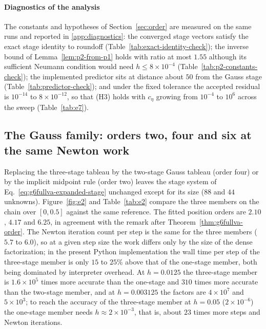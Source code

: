 \paragraph{Diagnostics of the analysis}
The constants and hypotheses of Section~\ref{sec:order} are measured on the same runs and
reported in \ref{app:diagnostics}: the converged stage vectors satisfy the exact stage identity to
roundoff (Table~\ref{tab:exact-identity-check}); the inverse bound of Lemma~\ref{lem:p2-from-p1}
holds with ratio at most $1.55$ although its sufficient Neumann condition would need
$h\le8\times10^{-4}$ (Table~\ref{tab:p2-constants-check}); the implemented predictor sits at
distance about $50$ from the Gauss stage (Table~\ref{tab:predictor-check}); and under the fixed
tolerance the accepted residual is $10^{-14}$ to $8\times10^{-12}$, so that (H3) holds with
$c_\eta$ growing from $10^{-4}$ to $10^{6}$ across the sweep (Table~\ref{tab:e7}).

\subsection{The Gauss family: orders two, four and six at the same Newton work}
\label{sec:e2}

Replacing the three-stage tableau by the two-stage Gauss tableau (order four) or by the implicit
midpoint rule (order two) leaves the stage system of Eq.~\eqref{eq:g6fullva-expanded-stage}
unchanged except for its size ($88$ and $44$ unknowns). Figure~\ref{fig:e2} and
Table~\ref{tab:e2} compare the three members on the chain over $[0,0.5]$ against the same
reference. The fitted position orders are $2.10$, $4.17$ and $6.25$, in agreement with the remark
after Theorem~\ref{thm:g6fullva-order}. The Newton iteration count per step is the same for the
three members ($5.7$ to $6.0$), so at a given step size the work differs only by the size of the
dense factorization; in the present Python implementation the wall time per step of the three-stage member is only
$15$ to $25\%$ above that of the one-stage member, both being dominated by interpreter overhead. At $h=0.0125$ the three-stage
member is $1.6\times10^{5}$ times more accurate than the one-stage and $310$ times more accurate
than the two-stage member, and at $h=0.003125$ the factors are $4\times10^{7}$ and
$5\times10^{3}$; to reach the accuracy of the three-stage member at $h=0.05$ ($2\times10^{-6}$)
the one-stage member needs $h\approx2\times10^{-3}$, that is, about $23$ times more steps and
Newton iterations.

